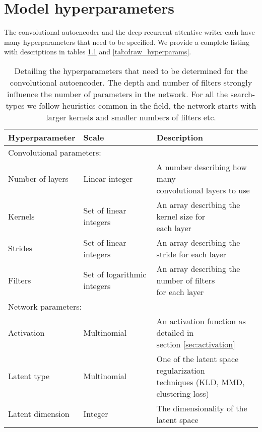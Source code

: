\chapter{Model hyperparameters}

The convolutional autoencoder and the deep recurrent attentive writer each have many hyperparameters that need to be specified. We provide a complete listing with descriptions in tables \ref{tab:convae_hyperparams} and \ref{tab:draw_hyperparams}.



\begin{table}
\centering
\caption{Detailing the hyperparameters that need to be determined for the convolutional autoencoder. The depth and number of filters strongly influence the number of parameters in the network. For all the search-types we follow heuristics common in the field, the network starts with larger kernels and smaller numbers of filters etc.}\label{tab:convae_hyperparams}
\setlength{\extrarowheight}{15pt}
\hspace*{-0.5in}
\begin{tabular}{lll}
\toprule
Hyperparameter & Scale & Description \\
\midrule
\multicolumn{3}{l}{Convolutional parameters: } \\
\midrule
Number of layers & Linear integer & \makecell[l]{A number describing how many \\ convolutional layers to use }\\
Kernels & Set of linear integers & \makecell[l]{An array describing the kernel size for \\ each layer} \\
Strides & Set of linear integers & An array describing the stride for each layer \\
Filters & Set of logarithmic integers & \makecell[l]{An array describing the number of filters \\ for each layer} \\ 
\midrule
\multicolumn{3}{l}{Network parameters: } \\
\midrule
Activation & Multinomial & \makecell[l]{An activation function as detailed in  \\ section \ref{sec:activation}} \\
Latent type & Multinomial & \makecell[l]{One of the latent space regularization \\techniques (KLD, MMD, clustering loss)} \\
Latent dimension & Integer & The dimensionality of the latent space \\

\end{tabular}
\end{table}
